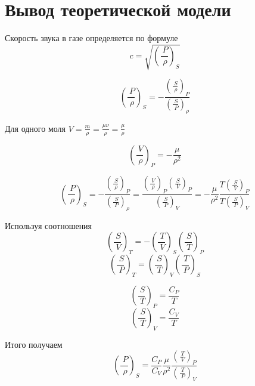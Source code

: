 \documentclass[a4paper,12pt]{article}
\begin{document}
\section{Вывод теоретической модели}
Скорость звука в газе определяется по формуле
\begin{equation}
    c = \sqrt{\left ( \frac{\ P}{\ \rho}\right )_S}
\end{equation}

\begin{equation}
 \left ( \frac{\ P}{\ \rho}\right )_S = - \frac{\left ( \frac{\ S}{\ \rho}\right )_P}{\left ( \frac{\ S}{\ P}\right )_\rho} 
\end{equation}

Для одного моля $V = \frac{m}{\rho} = \frac{\mu \nu}{\rho} = \frac{\mu}{\rho}$

\begin{equation}
 \left ( \frac{\ V}{\ \rho}\right )_P = - \frac{\mu}{\rho^2}
\end{equation}


\begin{equation}
    \left ( \frac{\ P}{\ \rho}\right )_S = - \frac{\left ( \frac{\ S}{\ \rho}\right )_P}{\left ( \frac{\ S}{\ P}\right )_\rho} = \frac{\left ( \frac{\ V}{\ \rho}\right )_P \left ( \frac{\ S}{\ V}\right )_P}{\left ( \frac{\ S}{\ P}\right )_V} = - \frac{\mu}{\rho^2} \frac{T \left ( \frac{\ S}{\ V}\right )_P}{T \left ( \frac{\ S}{\ P}\right )_V}
\end{equation}

Используя соотношения
\begin{equation}
    \left ( \frac{\ S}{\ V}\right )_T = - \left ( \frac{\ T}{\ V}\right )_S \left ( \frac{\ S}{\ T}\right )_P
\end{equation}
\begin{equation}
    \left ( \frac{\ S}{\ P}\right )_T = \left ( \frac{\ S}{\ T}\right )_V \left ( \frac{\ T}{\ P}\right )_S
\end{equation}

\begin{equation}
    \left ( \frac{\ S}{\ T}\right )_P = \frac{C_P}{T}
\end{equation}
\begin{equation}
    \left ( \frac{\ S}{\ T}\right )_V = \frac{C_V}{T}
\end{equation}

Итого получаем
\begin{equation}
\left ( \frac{\ P}{\ \rho}\right )_S = \frac{C_P}{C_V} \frac{\mu}{\rho^2}\frac{\left ( \frac{\ T}{\ V}\right )_P}{\left ( \frac{\ T}{\ P}\right )_V}
\end{equation}
\end{document}
